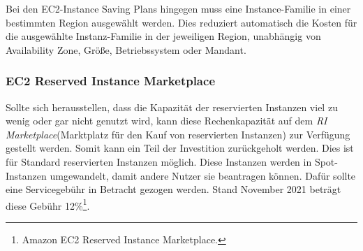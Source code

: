 Bei den EC2-Instance Saving Plans hingegen muss eine Instance-Familie in einer bestimmten Region ausgewählt werden.  Dies reduziert automatisch die Kosten für die ausgewählte Instanz-Familie in der jeweiligen Region, unabhängig von Availability Zone, Größe, Betriebssystem oder Mandant.

\subsubsection*{EC2 Reserved Instance Marketplace}\label{sssec:RI-Marketplace}
Sollte sich herausstellen, dass die Kapazität der reservierten Instanzen viel zu wenig oder gar nicht genutzt wird, kann diese Rechenkapazität auf dem \textit{RI Marketplace}(Marktplatz für den Kauf von reservierten Instanzen) zur Verfügung gestellt werden. Somit kann ein Teil der Investition zurückgeholt werden. Dies ist für Standard reservierten Instanzen möglich.
Diese Instanzen werden in Spot-Instanzen umgewandelt, damit andere Nutzer sie beantragen können. Dafür sollte eine Servicegebühr in Betracht gezogen werden. Stand November 2021 beträgt diese Gebühr 12\%\footnote{Amazon EC2 Reserved Instance Marketplace\cite{AMZ23}.}.

